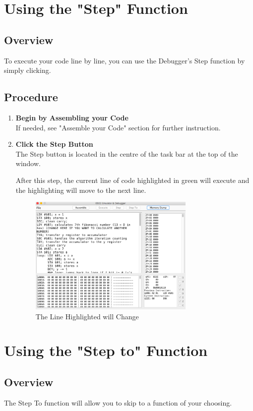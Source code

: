 \documentclass[a3paper, 11pt]{article}
\begin{document}
\section{Using the "Step" Function}
\subsection{Overview}
To execute your code line by line, you can use the Debugger's Step function by simply clicking. 
\subsection{Procedure}
\begin{enumerate}
	\item \textbf{Begin by Assembling your Code}\\
	If needed, see "Assemble your Code" section for further instruction.
	\item \textbf{Click the Step Button}\\
	The Step button is located in the centre of the task bar at the top of the window.
	\par
	After this step, the current line of code highlighted in green will execute and the highlighting will move to the next line. 
	\begin{figure}[h!]
		\centering
		\includegraphics[width=8cm, height=5.74cm]{Execute}
		\caption{The Line Highlighted will Change}
	\end{figure}
\end{enumerate}
\clearpage

\section{Using the "Step to" Function}
\subsection{Overview}
The Step To function will allow you to skip to a function of your choosing. 
\end{document}
